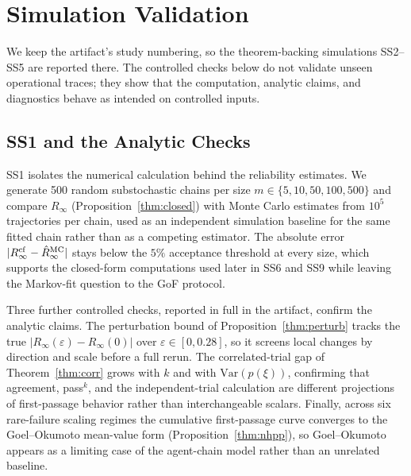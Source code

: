 \section{Simulation Validation}
\label{sec:sim}

We keep the artifact's study numbering, so the theorem-backing
simulations SS2--SS5 are reported there. The controlled checks below do
not validate unseen operational traces; they show that the computation,
analytic claims, and diagnostics behave as intended on controlled
inputs.

\subsection{SS1 and the Analytic Checks}

SS1 isolates the numerical calculation behind the reliability estimates.
We generate 500 random substochastic chains per size
$m \in \{5, 10, 50, 100, 500\}$ and compare $R_\infty$
(Proposition~\ref{thm:closed}) with Monte Carlo estimates from $10^5$
trajectories per chain, used as an independent simulation baseline for
the same fitted chain rather than as a competing estimator. The absolute
error $|R_\infty^{\rm cf} - \hat R_\infty^{\rm MC}|$ stays below the
$5\%$ acceptance threshold at every size, which supports the closed-form
computations used later in SS6 and SS9 while leaving the Markov-fit
question to the GoF protocol.

Three further controlled checks, reported in full in the artifact,
confirm the analytic claims. The perturbation bound of
Proposition~\ref{thm:perturb} tracks the true
$|R_\infty(\varepsilon)-R_\infty(0)|$ over $\varepsilon\in[0,0.28]$, so
it screens local changes by direction and scale before a full rerun. The
correlated-trial gap of Theorem~\ref{thm:corr} grows with $k$ and with
$\mathrm{Var}(p(\xi))$, confirming that agreement, pass$^k$, and the
independent-trial calculation are different projections of first-passage
behavior rather than interchangeable scalars. Finally, across six
rare-failure scaling regimes the cumulative first-passage curve
converges to the Goel--Okumoto mean-value form
(Proposition~\ref{thm:nhpp}), so Goel--Okumoto appears as a limiting case
of the agent-chain model rather than an unrelated baseline.

